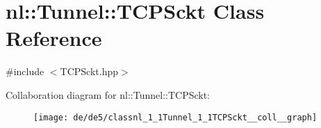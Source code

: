 \hypertarget{classnl_1_1Tunnel_1_1TCPSckt}{}\section{nl\+:\+:Tunnel\+:\+:T\+C\+P\+Sckt Class Reference}
\label{classnl_1_1Tunnel_1_1TCPSckt}


{\ttfamily \#include $<$T\+C\+P\+Sckt.\+hpp$>$}



Collaboration diagram for nl\+:\+:Tunnel\+:\+:T\+C\+P\+Sckt\+:
\nopagebreak
\begin{figure}[H]
\begin{center}
\leavevmode
\texttt{[image: de/de5/classnl\_1\_1Tunnel\_1\_1TCPSckt\_\_coll\_\_graph]}
\end{center}
\end{figure}
